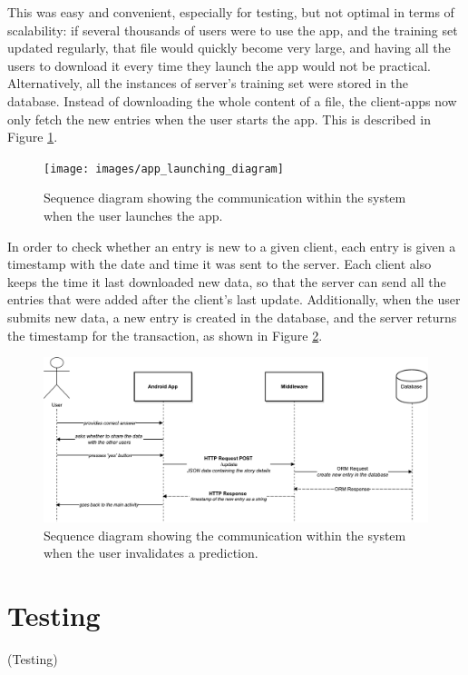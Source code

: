 \documentclass{mproj}
\begin{document}
This was easy and convenient, especially for testing, but not optimal in terms of scalability: if several thousands of users were to use the app, and the training set updated regularly, that file would quickly become very large, and having all the users to download it every time they launch the app would not be practical. Alternatively, all the instances of server's training set were stored in the database. Instead of downloading the whole content of a file, the client-apps now only fetch the new entries when the user starts the app. This is described in Figure \ref{fig:launch}.
\begin{figure}[h]
	\centering
	\texttt{[image: images/app\_launching\_diagram]}
	\caption{Sequence diagram showing the communication within the system when the user launches the app.}
	\label{fig:launch}
\end{figure}

In order to check whether an entry is new to a given client, each entry is given a timestamp with the date and time it was sent to the server. Each client also keeps the time it last downloaded new data, so that the server can send all the entries that were added after the client's last update. Additionally, when the user submits new data, a new entry is created in the database, and the server returns the timestamp for the transaction, as shown in Figure \ref{fig:new_entry}.
\begin{figure}[h]
	\centering
	\includegraphics[width=\textwidth]{images/wrong_prediction_diagram}
	\caption{Sequence diagram showing the communication within the system when the user invalidates a prediction.}
	\label{fig:new_entry}
\end{figure}

\section{Testing}

(Testing)
\end{document}
